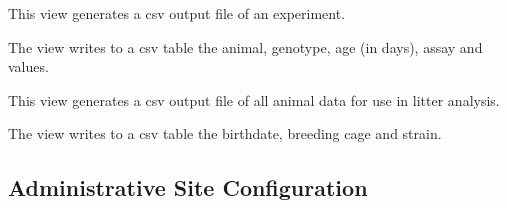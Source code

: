 \documentclass[letterpaper,10pt,english]{sphinxmanual}
\begin{document}
\begin{fulllineitems}
\label{api:mousedb.data.views.experiment_details_csv}
This view generates a csv output file of an experiment.

The view writes to a csv table the animal, genotype, age (in days), assay and values.

\end{fulllineitems}



\begin{fulllineitems}
\label{api:mousedb.data.views.experiment_list}
\end{fulllineitems}



\begin{fulllineitems}
\label{api:mousedb.data.views.litters_csv}
This view generates a csv output file of all animal data for use in litter analysis.

The view writes to a csv table the birthdate, breeding cage and strain.

\end{fulllineitems}



\begin{fulllineitems}
\label{api:mousedb.data.views.study_experiment}
\end{fulllineitems}

\label{api:module-mousedb.data.urls}

\subsection{Administrative Site Configuration}
\label{api:module-mousedb.data.admin}\label{api:administrative-site-configuration}
\end{document}
